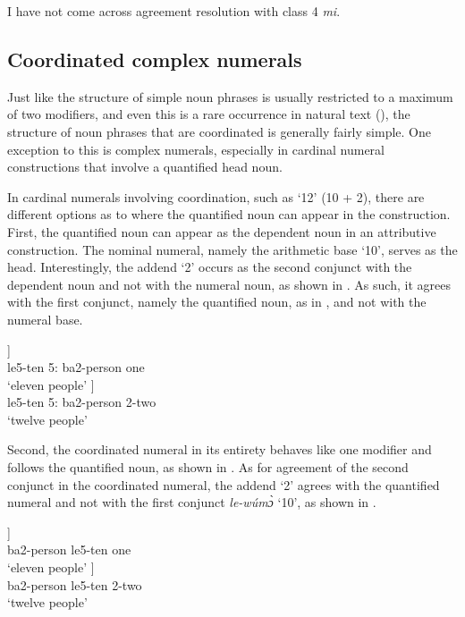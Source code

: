 I have not come across agreement resolution with class 4 {\itshape mi}. 



\subsection{Coordinated complex numerals}
Just like the structure of simple noun phrases is usually restricted to a maximum of two modifiers, and even this is a rare occurrence in natural text (), the structure of noun phrases that are coordinated is generally fairly simple. One exception to this is complex numerals, especially in cardinal numeral constructions that involve a quantified head noun.

In cardinal numerals involving coordination, such as `12' (10 + 2),  there are different options as to where the quantified noun can appear in the construction. First, the quantified noun can appear as the dependent noun in an attributive construction. The nominal numeral, namely the arithmetic base `10', serves as the head. Interestingly, the addend `2' occurs as the second conjunct with the dependent noun and not with the numeral noun, as shown in . As such, it agrees with the first conjunct, namely the quantified noun, as in , and not with the numeral base. 

\ea\label{NumCoord4}
\ea \label{NumCoord4a}
  \gll     [lè-wúmɔ̀ lé [b-ùdì {\bfseries nà} vúdũ̂]] \\
{\db}le5-ten 5:{\ATT} {\db}ba2-person {\COM} one \\
    \trans `eleven people'
\ex\label{NumCoord4b}
 \gll    [lè-wúmɔ̀ lé [b-ùdì {\bfseries nà} bá-báà]] \\
{\db}le5-ten 5:{\ATT} {\db}ba2-person {\COM} 2-two \\
    \trans `twelve people'
\z
\z



Second, the coordinated numeral in its entirety behaves like one modifier and follows the quantified noun, as shown in . As for agreement of the second conjunct in the coordinated numeral, the addend `2' agrees with the quantified numeral and not with the first conjunct {\itshape le-wúmɔ̀} `10', as shown in .

\ea\label{NumCoord5}
\ea \label{NumCoord5b}
  \gll   [b-ùdì [lè-wúmɔ̀ {\bfseries nà} vúdũ̂]] \\
 {\db}ba2-person {\db}le5-ten {\COM} one \\
    \trans `eleven people'
\ex\label{NumCoordb2}
 \gll   [b-ùdì [lè-wúmɔ̀ {\bfseries nà} bá-báà]] \\
{\db}ba2-person {\db}le5-ten {\COM} 2-two \\
    \trans `twelve people'
\z
\z



